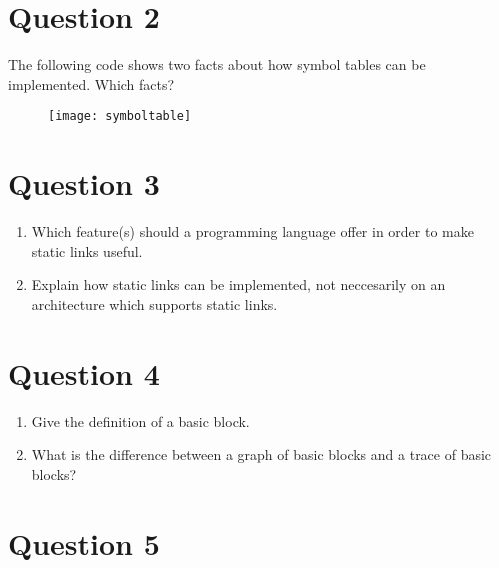 \documentclass{report}
\begin{document}
\section*{Question 2}
The following code shows two facts about how symbol tables can be implemented. Which facts?
\begin{figure}[ht]
    \centering
    \texttt{[image: symboltable]}
\end{figure}

\newpage
\section*{Question 3}
\begin{enumerate}
    \item Which feature(s) should a programming language offer in order to make static links useful.
    \item Explain how static links can be implemented, not neccesarily on an architecture which supports static links.
\end{enumerate}

\section*{Question 4}
\begin{enumerate}
    \item Give the definition of a basic block.
    \item What is the difference between a graph of basic blocks and a trace of basic blocks?
\end{enumerate}

\section*{Question 5}
\end{document}
